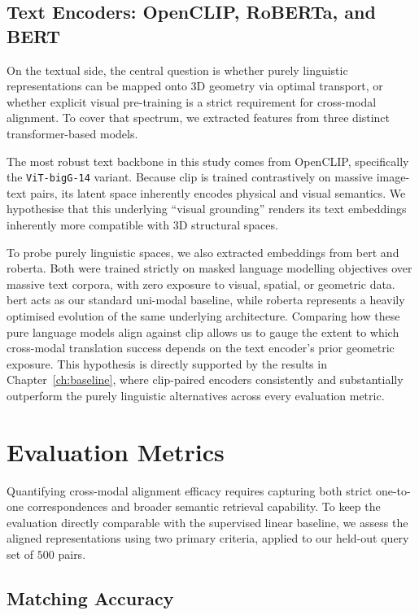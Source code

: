 \subsection{Text Encoders: OpenCLIP, RoBERTa, and BERT}
\label{subsec:text_encoders_setup}

On the textual side, the central question is whether purely linguistic representations can be mapped onto 3D geometry via optimal transport, or whether explicit visual pre-training is a strict requirement for cross-modal alignment. To cover that spectrum, we extracted features from three distinct transformer-based models.

The most robust text backbone in this study comes from OpenCLIP, specifically the \texttt{ViT-bigG-14} variant. Because \gls{clip} is trained contrastively on massive image-text pairs, its latent space inherently encodes physical and visual semantics. We hypothesise that this underlying ``visual grounding'' renders its text embeddings inherently more compatible with 3D structural spaces.

To probe purely linguistic spaces, we also extracted embeddings from \gls{bert} and \gls{roberta}. Both were trained strictly on masked language modelling objectives over massive text corpora, with zero exposure to visual, spatial, or geometric data. \gls{bert} acts as our standard uni-modal baseline, while \gls{roberta} represents a heavily optimised evolution of the same underlying architecture. Comparing how these pure language models align against \gls{clip} allows us to gauge the extent to which cross-modal translation success depends on the text encoder's prior geometric exposure. This hypothesis is directly supported by the results in Chapter~\ref{ch:baseline}, where \gls{clip}-paired encoders consistently and substantially outperform the purely linguistic alternatives across every evaluation metric.

\section{Evaluation Metrics}
\label{sec:metrics}

Quantifying cross-modal alignment efficacy requires capturing both strict one-to-one correspondences and broader semantic retrieval capability. To keep the evaluation directly comparable with the supervised linear baseline, we assess the aligned representations using two primary criteria, applied to our held-out query set of $500$ pairs.

\subsection{Matching Accuracy}
\label{subsec:matching_acc}

